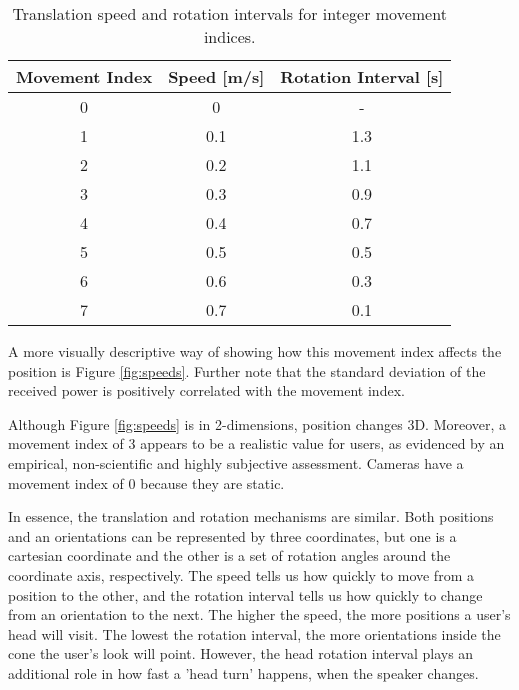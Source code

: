 \begin{table}[htp]
    \centering
    \caption{Translation speed and rotation intervals for integer movement indices.}
    \label{tab:head_speeds}
    \begin{tabular}{|c|c|c|}
    \hline
    Movement Index & Speed {[}m/s{]} & Rotation Interval {[}s{]} \\ \hline
    0              & 0               & -                         \\ \hline
    1              & 0.1             & 1.3                       \\ \hline
    2              & 0.2             & 1.1                       \\ \hline
    3              & 0.3             & 0.9                       \\ \hline
    4              & 0.4             & 0.7                       \\ \hline
    5              & 0.5             & 0.5                       \\ \hline
    6              & 0.6             & 0.3                       \\ \hline
    7              & 0.7             & 0.1                       \\ \hline
    \end{tabular}
\end{table}

A more visually descriptive way of showing how this movement index affects the position is Figure \ref{fig:speeds}. Further note that the standard deviation of the received power is positively correlated with the movement index.


Although Figure \ref{fig:speeds} is in 2-dimensions, position changes  3D. Moreover, a movement index of 3 appears to be a realistic value for users, as evidenced by an empirical, non-scientific and highly subjective assessment. Cameras have a movement index of 0 because they are static.

In essence, the translation and rotation mechanisms are similar. Both positions and an orientations can be represented by three coordinates, but one is a cartesian coordinate and the other is a set of rotation angles around the coordinate axis, respectively. The speed tells us how quickly to move from a position to the other, and the rotation interval tells us how quickly to change from an orientation to the next. The higher the speed, the more positions a user's head will visit. The lowest the rotation interval, the more orientations inside the cone the user's look will point. However, the head rotation interval plays an additional role in how fast a 'head turn' happens, when the speaker changes. 


